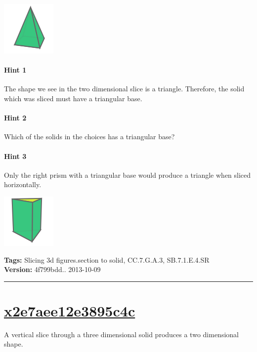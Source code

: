 \documentclass[twocolumn,10pt]{article}
\def\shrinkfactor{0.4}
\begin{document}
\includegraphics[scale=\shrinkfactor]{figures/8e0bce39d089e690c82fd2275ed9e00339fd8202.png}



\paragraph{Hint 1}The shape we see in the two dimensional slice is a triangle. Therefore, the solid which was sliced must have a triangular base. 

\paragraph{Hint 2}Which of the solids in the choices has a triangular base?

\paragraph{Hint 3}Only the right prism with a triangular base would produce a triangle when sliced horizontally.


\includegraphics[scale=\shrinkfactor]{figures/df7e52cb3a541015199076ff457ee6bdda3a663c.png}



\medskip
\noindent
\textbf{Tags:} {\footnotesize Slicing 3d figures.section to solid, CC.7.G.A.3, SB.7.1.E.4.SR}\\
\textbf{Version:} 4f799bdd.. 2013-10-09
\smallskip\hrule





\section{\href{https://www.khanacademy.org/devadmin/content/items/x2e7aee12e3895c4c}{x2e7aee12e3895c4c}}

\noindent
A vertical slice through a three dimensional solid produces a two dimensional shape.
\end{document}
